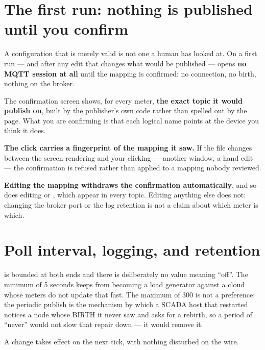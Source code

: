 \section{The first run: nothing is published until you confirm}
\label{sec:confirmscreen}

A configuration that is merely valid is not one a human has looked at. On a first run --- and
after any edit that changes what would be published --- \prog opens \textbf{no MQTT session at
all} until the mapping is confirmed: no connection, no birth, nothing on the broker.

The confirmation screen shows, for every meter, \textbf{the exact topic it would publish on},
built by the publisher's own code rather than spelled out by the page. What you are confirming
is that each logical name points at the device you think it does.

\begin{note}
\textbf{The click carries a fingerprint of the mapping it saw.} If the file changes between the
screen rendering and your clicking --- another window, a hand edit --- the confirmation is
refused rather than applied to a mapping nobody reviewed.
\end{note}

\begin{note}
\textbf{Editing the mapping withdraws the confirmation automatically}, and so does editing
 or , which appear in every topic. Editing anything else does
not: changing the broker port or the log retention is not a claim about which meter is which.
\end{note}

\section{Poll interval, logging, and retention}

 is bounded at both ends and there is deliberately no value
meaning ``off''. The minimum of 5 seconds keeps \prog from becoming a load generator
against a cloud whose meters do not update that fast. The maximum of 300 is not a
preference: the periodic publish is the mechanism by which a SCADA host that restarted
notices a node whose BIRTH it never saw and asks for a rebirth, so a period of ``never''
would not slow that repair down --- it would remove it.

A change takes effect on the next tick, with nothing disturbed on the wire.

